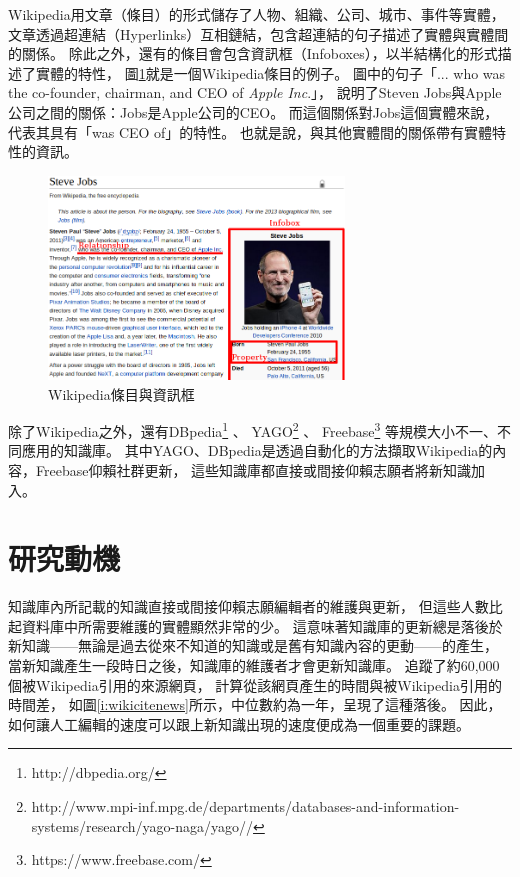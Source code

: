 Wikipedia用文章（條目）的形式儲存了人物、組織、公司、城市、事件等實體，
文章透過超連結（Hyperlinks）互相鏈結，包含超連結的句子描述了實體與實體間的關係。
除此之外，還有的條目會包含資訊框（Infoboxes），以半結構化的形式描述了實體的特性，
圖\ref{i:wiki}就是一個Wikipedia條目的例子。
圖中的句子「... who was the co-founder, chairman, and CEO of \emph{Apple Inc}.」，
說明了Steven Jobs與Apple公司之間的關係：Jobs是Apple公司的CEO。
而這個關係對Jobs這個實體來說，代表其具有「was CEO of」的特性。
也就是說，與其他實體間的關係帶有實體特性的資訊。

\begin{figure}
    \centering
    \includegraphics[width=0.7\textwidth]{images/01-wiki-as-kb}
    \caption{Wikipedia條目與資訊框}
    \label{i:wiki}
\end{figure}

除了Wikipedia之外，還有DBpedia\footnote{http://dbpedia.org/} \citep{dbpedia}、
YAGO\footnote{http://www.mpi-inf.mpg.de/departments/databases-and-information-systems/research/yago-naga/yago//} \citep{yago}、
Freebase\footnote{https://www.freebase.com/} \citep{freebase}等規模大小不一、不同應用的知識庫。
其中YAGO、DBpedia是透過自動化的方法擷取Wikipedia的內容，Freebase仰賴社群更新，
這些知識庫都直接或間接仰賴志願者將新知識加入。

%
%
\section{研究動機}
知識庫內所記載的知識直接或間接仰賴志願編輯者的維護與更新，
但這些人數比起資料庫中所需要維護的實體顯然非常的少。
這意味著知識庫的更新總是落後於新知識——無論是過去從來不知道的知識或是舊有知識內容的更動——的產生，
當新知識產生一段時日之後，知識庫的維護者才會更新知識庫。
\cite{kba2012}追蹤了約60,000個被Wikipedia引用的來源網頁，
計算從該網頁產生的時間與被Wikipedia引用的時間差，
如圖\ref{i:wikicitenews}所示，中位數約為一年，呈現了這種落後。
因此，如何讓人工編輯的速度可以跟上新知識出現的速度便成為一個重要的課題。

